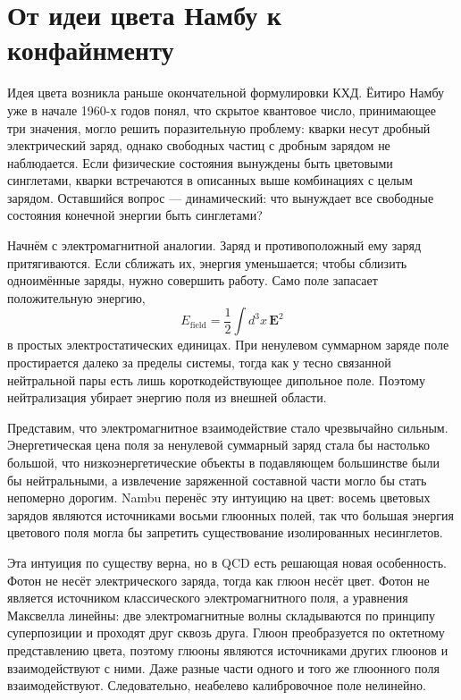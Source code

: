 \section{От идеи цвета Намбу к конфайнменту}

Идея цвета возникла раньше окончательной формулировки КХД. Ёитиро Намбу уже
в начале 1960-х годов понял, что скрытое квантовое число, принимающее три значения, могло
решить поразительную проблему: кварки несут дробный электрический заряд, однако свободных
частиц с дробным зарядом не наблюдается. Если физические состояния вынуждены
быть цветовыми синглетами, кварки встречаются в описанных выше комбинациях с
целым зарядом. Оставшийся вопрос — динамический: что вынуждает все свободные
состояния конечной энергии быть синглетами?

Начнём с электромагнитной аналогии. Заряд и противоположный ему заряд притягиваются. Если сближать их, энергия уменьшается; чтобы сблизить одноимённые заряды, нужно совершить работу. Само поле запасает положительную энергию,
\begin{equation}
E_{\mathrm{field}}
=\frac12\int d^3x\,\boldsymbol E^2
\end{equation}
в простых электростатических единицах. При ненулевом суммарном заряде поле простирается далеко за пределы системы, тогда как у тесно связанной нейтральной пары есть лишь короткодействующее дипольное поле. Поэтому нейтрализация убирает энергию поля из внешней области.

Представим, что электромагнитное взаимодействие стало чрезвычайно сильным. Энергетическая цена поля за ненулевой суммарный заряд стала бы настолько большой, что низкоэнергетические объекты в подавляющем большинстве были бы нейтральными, а извлечение заряженной составной части могло бы стать непомерно дорогим. Nambu перенёс эту интуицию на цвет: восемь цветовых зарядов являются источниками восьми глюонных полей, так что большая энергия цветового поля могла бы запретить существование изолированных несинглетов.

Эта интуиция по существу верна, но в QCD есть решающая новая особенность. Фотон не несёт электрического заряда, тогда как глюон несёт цвет. Фотон не является источником классического электромагнитного поля, а уравнения Максвелла линейны: две электромагнитные волны складываются по принципу суперпозиции и проходят друг сквозь друга. Глюон преобразуется по октетному представлению цвета, поэтому глюоны являются источниками других глюонов и взаимодействуют с ними. Даже разные части одного и того же глюонного поля взаимодействуют. Следовательно, неабелево калибровочное поле нелинейно.

